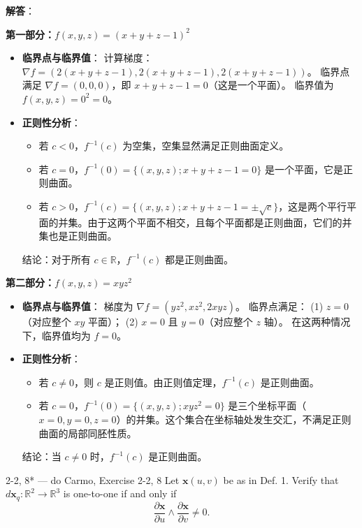 \begin{solution}
\textbf{解答}：

\textbf{第一部分：$f(x, y, z) = (x + y + z - 1)^2$}
\begin{itemize}
    \item[a.] \textbf{临界点与临界值}：
    计算梯度：$\nabla f = (2(x+y+z-1), 2(x+y+z-1), 2(x+y+z-1))$。
    临界点满足 $\nabla f = (0, 0, 0)$，即 $x + y + z - 1 = 0$（这是一个平面）。
    临界值为 $f(x, y, z) = 0^2 = 0$。
    \item[b.] \textbf{正则性分析}：
    \begin{itemize}
        \item 若 $c < 0$，$f^{-1}(c)$ 为空集，空集显然满足正则曲面定义。
        \item 若 $c = 0$，$f^{-1}(0) = \{(x,y,z); x+y+z-1=0\}$ 是一个平面，它是正则曲面。
        \item 若 $c > 0$，$f^{-1}(c) = \{(x,y,z); x+y+z-1 = \pm\sqrt{c}\}$，这是两个平行平面的并集。由于这两个平面不相交，且每个平面都是正则曲面，它们的并集也是正则曲面。
    \end{itemize}
    结论：对于所有 $c \in \mathbb{R}$，$f^{-1}(c)$ 都是正则曲面。
\end{itemize}

\textbf{第二部分：$f(x, y, z) = xyz^2$}
\begin{itemize}
    \item[c1.] \textbf{临界点与临界值}：
    梯度为 $\nabla f = (yz^2, xz^2, 2xyz)$。
    临界点满足：
    (1) $z = 0$（对应整个 $xy$ 平面）；
    (2) $x = 0$ 且 $y = 0$（对应整个 $z$ 轴）。
    在这两种情况下，临界值均为 $f = 0$。
    \item[c2.] \textbf{正则性分析}：
    \begin{itemize}
        \item 若 $c \neq 0$，则 $c$ 是正则值。由正则值定理，$f^{-1}(c)$ 是正则曲面。
        \item 若 $c = 0$，$f^{-1}(0) = \{(x,y,z); xyz^2 = 0\}$ 是三个坐标平面（$x=0, y=0, z=0$）的并集。这个集合在坐标轴处发生交汇，不满足正则曲面的局部同胚性质。
    \end{itemize}
    结论：当 $c \neq 0$ 时，$f^{-1}(c)$ 是正则曲面。
\end{itemize}
\end{solution}

\begin{exercise}{2-2, 8* — do Carmo, Exercise 2-2, 8}
Let $\mathbf{x}(u, v)$ be as in Def. 1. Verify that $d\mathbf{x}_q: \mathbb{R}^2 \to \mathbb{R}^3$ is one-to-one if and only if
\[
\frac{\partial \mathbf{x}}{\partial u} \wedge \frac{\partial \mathbf{x}}{\partial v} \neq 0.
\]
\end{exercise}

